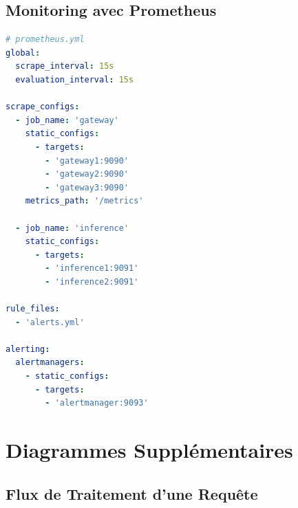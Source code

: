 \documentclass[12pt,a4paper]{article}
\begin{document}
\subsection{Monitoring avec Prometheus}

\begin{lstlisting}[language=yaml]
# prometheus.yml
global:
  scrape_interval: 15s
  evaluation_interval: 15s

scrape_configs:
  - job_name: 'gateway'
    static_configs:
      - targets: 
        - 'gateway1:9090'
        - 'gateway2:9090'
        - 'gateway3:9090'
    metrics_path: '/metrics'
    
  - job_name: 'inference'
    static_configs:
      - targets:
        - 'inference1:9091'
        - 'inference2:9091'
    
rule_files:
  - 'alerts.yml'

alerting:
  alertmanagers:
    - static_configs:
      - targets:
        - 'alertmanager:9093'
\end{lstlisting}

\newpage
\section{Diagrammes Supplémentaires}

\subsection{Flux de Traitement d'une Requête}
\end{document}
